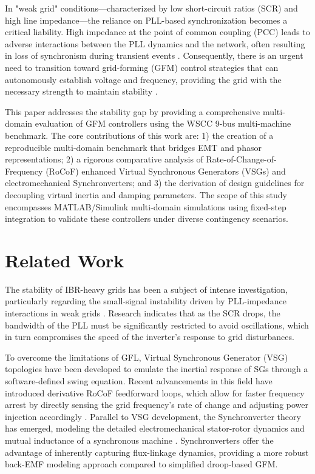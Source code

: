 \documentclass[conference]{IEEEtran}
\begin{document}
In "weak grid" conditions—characterized by low short-circuit ratios (SCR) and high line impedance—the reliance on PLL-based synchronization becomes a critical liability. High impedance at the point of common coupling (PCC) leads to adverse interactions between the PLL dynamics and the network, often resulting in loss of synchronism during transient events \cite{Grid_WSCC_Stability}. Consequently, there is an urgent need to transition toward grid-forming (GFM) control strategies that can autonomously establish voltage and frequency, providing the grid with the necessary strength to maintain stability \cite{GFM_GFL_Comparison}.

This paper addresses the stability gap by providing a comprehensive multi-domain evaluation of GFM controllers using the WSCC 9-bus multi-machine benchmark. The core contributions of this work are: 1) the creation of a reproducible multi-domain benchmark that bridges EMT and phasor representations; 2) a rigorous comparative analysis of Rate-of-Change-of-Frequency (RoCoF) enhanced Virtual Synchronous Generators (VSGs) and electromechanical Synchronverters; and 3) the derivation of design guidelines for decoupling virtual inertia and damping parameters. The scope of this study encompasses MATLAB/Simulink multi-domain simulations using fixed-step integration to validate these controllers under diverse contingency scenarios.

\section{Related Work}\label{sec:related}
The stability of IBR-heavy grids has been a subject of intense investigation, particularly regarding the small-signal instability driven by PLL-impedance interactions in weak grids \cite{PLL_SmallSignal_WeakGrid}. Research indicates that as the SCR drops, the bandwidth of the PLL must be significantly restricted to avoid oscillations, which in turn compromises the speed of the inverter’s response to grid disturbances.

To overcome the limitations of GFL, Virtual Synchronous Generator (VSG) topologies have been developed to emulate the inertial response of SGs through a software-defined swing equation. Recent advancements in this field have introduced derivative RoCoF feedforward loops, which allow for faster frequency arrest by directly sensing the grid frequency's rate of change and adjusting power injection accordingly \cite{VSG_RoCoF_Control}. Parallel to VSG development, the Synchronverter theory has emerged, modeling the detailed electromechanical stator-rotor dynamics and mutual inductance of a synchronous machine \cite{Synchronverter_Dynamics}. Synchronverters offer the advantage of inherently capturing flux-linkage dynamics, providing a more robust back-EMF modeling approach compared to simplified droop-based GFM.
\end{document}
